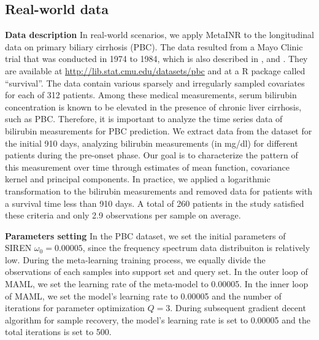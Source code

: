 \documentclass{article}
\begin{document}
\subsection{Real-world data}
\textbf{Data description} 
In real-world scenarios, we apply MetaINR to the longitudinal data on primary biliary cirrhosis (PBC).
The data resulted from a Mayo Clinic trial that was conducted in 1974 to 1984, 
which is also described in \cite{markus1989efficacy}, \cite{fleming2013counting} and \cite{murtaugh1994primary}. 
They are available at \url{http://lib.stat.cmu.edu/datasets/pbc} and at a R package called ``survival''.
The data contain various sparsely and irregularly sampled covariates for each of 312 patients. 
Among these medical measurements,
serum bilirubin concentration is known to be elevated in the presence of chronic liver cirrhosis, such as PBC.
Therefore, it is important to analyze the time series data of bilirubin measurements for PBC prediction.
We extract data from the dataset for the initial 910 days, 
analyzing bilirubin measurements (in mg/dl) for different patients 
during the pre-onset phase. 
Our goal is to characterize the pattern of this measurement over time through estimates of mean function, covariance kernel and principal components.
In practice, we applied a logarithmic transformation to the bilirubin measurements and removed data for patients with a survival time less than 910 days.
A total of 260 patients in the study satisfied these criteria and only 2.9 observations per sample on average. 

\textbf{Parameters setting} 
In the PBC dataset, we set the initial parameters of SIREN $\omega_0=0.00005$, since the frequency spectrum data distribuiton is relatively low.
During the meta-learning training process, we equally divide the observations of each samples into support set and query set.
In the outer loop of MAML, we set the learning rate of the meta-model to 0.00005. 
In the inner loop of MAML, we set the model's learning rate to 0.00005 and the number of iterations for parameter optimization $Q=3$.
During subsequent gradient decent algorithm for sample recovery, the model's learning rate is set to 0.00005 and the total iterations is set to 500.
\end{document}
